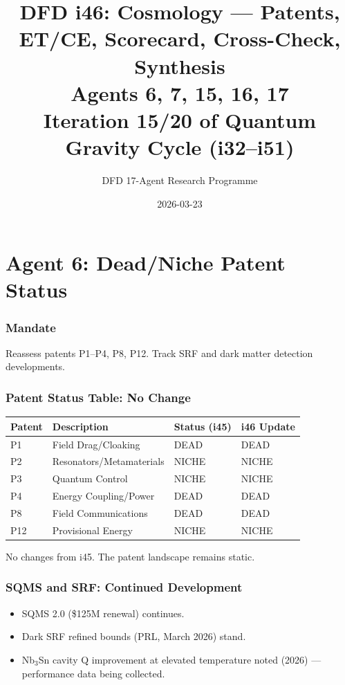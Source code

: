 \documentclass[11pt,a4paper]{article}
\title{DFD i46: Cosmology --- Patents, ET/CE, Scorecard, Cross-Check, Synthesis\\[6pt]
\large Agents 6, 7, 15, 16, 17\\[6pt]
\normalsize Iteration 15/20 of Quantum Gravity Cycle (i32--i51)}
\author{DFD 17-Agent Research Programme}
\date{2026-03-23}
\begin{document}
\maketitle
\tableofcontents
\newpage

\part{Agent 6: Dead/Niche Patent Status}
\label{part:agent6}

\section{Mandate}

Reassess patents P1--P4, P8, P12. Track SRF and dark matter detection developments.

\section{Patent Status Table: No Change}

\begin{center}
\begin{tabular}{llll}
\toprule
\textbf{Patent} & \textbf{Description} & \textbf{Status (i45)} & \textbf{i46 Update} \\
\midrule
P1 & Field Drag/Cloaking & DEAD & DEAD \\
P2 & Resonators/Metamaterials & NICHE & NICHE \\
P3 & Quantum Control & NICHE & NICHE \\
P4 & Energy Coupling/Power & DEAD & DEAD \\
P8 & Field Communications & DEAD & DEAD \\
P12 & Provisional Energy & NICHE & NICHE \\
\bottomrule
\end{tabular}
\end{center}

No changes from i45. The patent landscape remains static.

\section{SQMS and SRF: Continued Development}

\begin{itemize}
\item SQMS 2.0 (\$125M renewal) continues.
\item Dark SRF refined bounds (PRL, March 2026) stand.
\item Nb$_3$Sn cavity Q improvement at elevated temperature noted (2026) --- performance data being collected.
\end{itemize}
\end{document}
